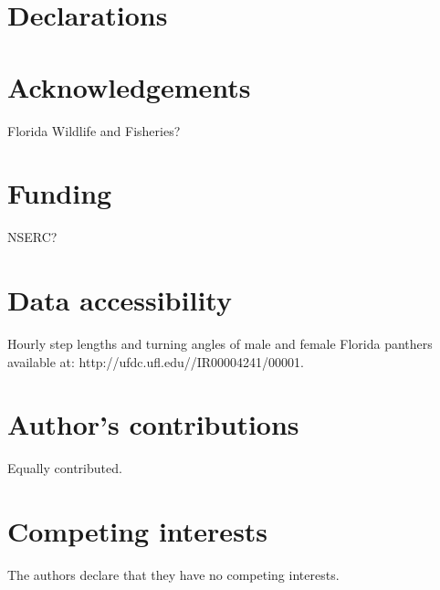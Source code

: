 \documentclass{bmcart}
\begin{document}

\section*{Declarations}

\begin{backmatter}

\section*{Acknowledgements}
  Florida Wildlife and Fisheries?
  
\section*{Funding}
 NSERC? 

\section{Data accessibility}
Hourly step lengths and turning angles of male and female Florida panthers available at: http://ufdc.ufl.edu//IR00004241/00001.

\section*{Author's contributions}
    Equally contributed.


\section*{Competing interests}
  The authors declare that they have no competing interests.




\end{backmatter}
\end{document}
